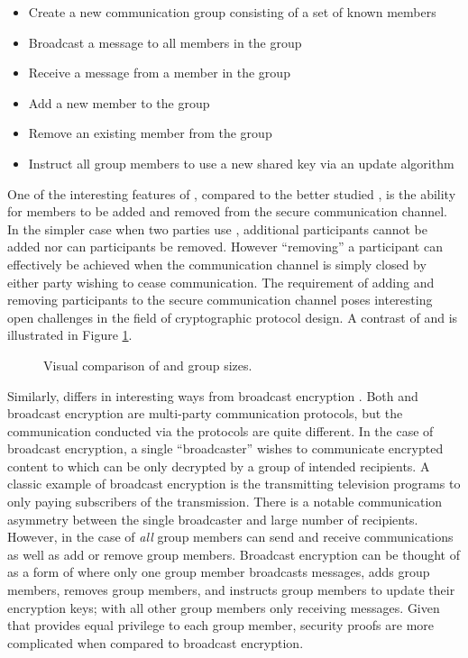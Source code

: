 \begin{itemize}
\item Create a new communication group consisting of a set of known members
\item Broadcast a message to all members in the group
\item Receive a message from a member in the group
\item Add a new member to the group
\item Remove an existing member from the group
\item Instruct all group members to use a new shared key via an update algorithm
\end{itemize}

One of the interesting features of , compared to the better studied , is the ability for members to be added and removed from the secure communication channel.
In the simpler case when two parties use , additional participants cannot be added nor can participants be removed.
However ``removing'' a participant can effectively be achieved when the communication channel is simply closed by either party wishing to cease communication.
The  requirement of adding and removing participants to the secure communication channel poses interesting open challenges in the field of cryptographic protocol design.
A contrast of  and  is illustrated in Figure \ref{fig:Secure-Messaging-And-Secure-Group-Messaging}.

\begin{figure}[ht!]
  \centering
  \caption[Secure Messaging and Secure Group Messaging]{%
  \label{fig:Secure-Messaging-And-Secure-Group-Messaging}%
  Visual comparison of  and  group sizes.
  }%
%
\end{figure}

Similarly,  differs in interesting ways from broadcast encryption \autocite{fiat1993broadcast}.
Both  and broadcast encryption are multi-party communication protocols, but the communication conducted via the protocols are quite different.
In the case of broadcast encryption, a single ``broadcaster'' wishes to communicate encrypted content to which can be only decrypted by a group of intended recipients.
A classic example of broadcast encryption is the transmitting television programs to only paying subscribers of the transmission.
There is a notable communication asymmetry between the single broadcaster and large number of recipients.
However, in the case of  \emph{all} group members can send and receive communications as well as add or remove group members.
Broadcast encryption can be thought of as a form of  where only one group member broadcasts messages, adds group members, removes group members, and instructs group members to update their encryption keys; with all other group members only receiving messages.
Given that  provides equal privilege to each group member, security proofs are more complicated when compared to broadcast encryption. 


